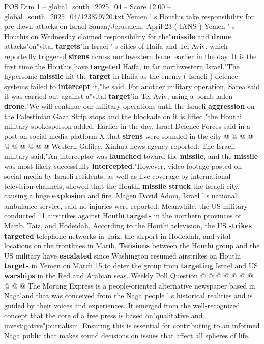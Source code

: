 \begin{textsample}{POS Dim 1 – global\_south\_2025\_04 – Score 12.00 – global\_south\_2025\_04/123879720.txt}  \label{ex:f1_pos_326}
Yemen ' s Houthis take responsibility for pre-dawn attacks on Israel Sanaa/Jerusalem, April 23 ( IANS ) Yemen ' s Houthis on Wednesday claimed responsibility for the"\textbf{missile} and \textbf{drone} attacks"on"vital \textbf{targets}"in Israel ' s cities of Haifa and Tel Aviv, which reportedly triggered \textbf{sirens} across northwestern Israel earlier in the day.
It is the first time the Houthis have \textbf{targeted} Haifa, in far northwestern Israel."The hypersonic \textbf{missile} hit the \textbf{target} in Haifa as the enemy ( Israeli ) defence systems failed to \textbf{intercept} it,"he said.
For another military operation, Sarea said it was carried out against a"vital \textbf{target}"in Tel Aviv, using a bomb-laden \textbf{drone}."We will continue our military operations until the Israeli \textbf{aggression} on the Palestinian Gaza Strip stops and the blockade on it is lifted,"the Houthi military spokesperson added.
Earlier in the day, Israel Defence Forces said in a post on social media platform X that \textbf{sirens} were sounded in the city @ @ @ @ @ @ @ @ @ @ Western Galilee, Xinhua news agency reported.
The Israeli military said,"An interceptor was \textbf{launched} toward the \textbf{missile}, and the \textbf{missile} was most likely successfully \textbf{intercepted}."However, video footage posted on social media by Israeli residents, as well as live coverage by international television channels, showed that the Houthi \textbf{missile} \textbf{struck} the Israeli city, causing a huge \textbf{explosion} and fire.
Magen David Adom, Israel ' s national ambulance service, said no injuries were reported.
Meanwhile, the US military conducted 11 airstrikes against Houthi \textbf{targets} in the northern provinces of Marib, Taiz, and Hodeidah.
According to the Houthi television, the US \textbf{strikes} \textbf{targeted} telephone networks in Taiz, the airport in Hodeidah, and vital locations on the frontlines in Marib. \textbf{Tensions} between the Houthi group and the US military have \textbf{escalated} since Washington resumed airstrikes on Houthi \textbf{targets} in Yemen on March 15 to deter the group from \textbf{targeting} Israel and US \textbf{warships} in the Red and Arabian seas.
Weekly Poll Question @ @ @ @ @ @ @ @ @ @ The Morung Express is a people-oriented alternative newspaper based in Nagaland that was conceived from the Naga people ' s historical realities and is guided by their voices and experiences.
It emerged from the well-recognized concept that the core of a free press is based on"qualitative and investigative"journalism.
Ensuring this is essential for contributing to an informed Naga public that makes sound decisions on issues that affect all spheres of life.

\end{textsample}
